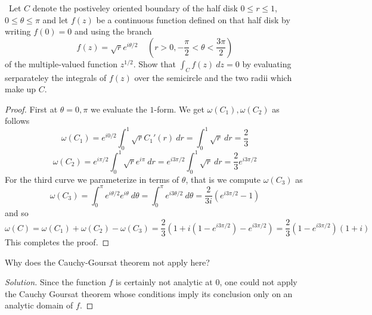 \documentclass[11pt]{amsart}
\theoremstyle{definition}
\numberwithin{theorem}{section}
\numberwithin{definition}{section}
\numberwithin{equation}{section}
\newenvironment{solution}
  {\begin{proof}[Solution]}
  {\end{proof}}
\begin{document}
\medskip {}\ Let $C$ denote the postiveley oriented boundary of the half disk $0 \leq r \leq 1$, $0 \leq \theta \leq \pi$
and let $f(z)$ be a continuous function defined on that half disk by writing $f(0) = 0$ and
using the branch
\begin{equation*}
	f(z) = \sqrt{r} e^{i\theta/2}\;\;\;\;\left(r > 0, -\frac{\pi}{2} < \theta < \frac{3\pi}{2}\right)
\end{equation*}
of the multiple-valued function $z^{1/2}.$ Show that $\int_C f(z)\ dz = 0$ by evaluating serparateley the integrals of $f(z)$ over the semicircle
and the two radii which make up $C$.
\begin{proof}
	First at $\theta = 0, \pi$ we evaluate the $1$-form. We get $\omega(C_1), \omega(C_2)$ as follows
	\begin{equation*}
		\omega(C_1) = e^{i0/2}\int_0^1 \sqrt{r} C_1'(r)\ dr = \int_0^1 \sqrt{r}\ dr =\frac{2}{3}
	\end{equation*}
	\begin{equation*}
		\omega(C_2) = e^{i\pi/2}\int_0^1 \sqrt{r} e^{i\pi}\ dr = e^{i3\pi/2}\int_0^1 \sqrt{r}\ dr =\frac{2}{3} e^{i3\pi/2}
	\end{equation*}
	For the third curve we parameterize in terms of $\theta$, that is we compute $\omega(C_3)$ as
	\begin{equation*}
		\omega(C_3) = \int_0^\pi e^{i\theta/2}e^{i\theta}\ d\theta = \int_0^\pi e^{i3\theta/2}\ d\theta = \frac{2}{3i}\left(e^{i3\pi/2}-1 \right)
	\end{equation*}
	and so \begin{equation*}
		\omega(C) = \omega(C_1) + \omega(C_2) - \omega(C_3) = \frac{2}{3}\left(1 + i\left(1 - e^{i3\pi/2}\right) -  e^{i3\pi/2}\right) = \frac{2}{3}\left(1 - e^{i3\pi/2}\right)(1+i)
	\end{equation*}
	This completes the proof.
\end{proof}

 \noindent Why does the Cauchy-Goursat theorem not apply here? 
 \begin{solution}
 Since the function $f$ is certainly not analytic at $0$, one could not apply the Cauchy Goursat theorem whose conditions imply its conclusion only on an analytic domain of $f$.
 \end{solution}
\end{document}
